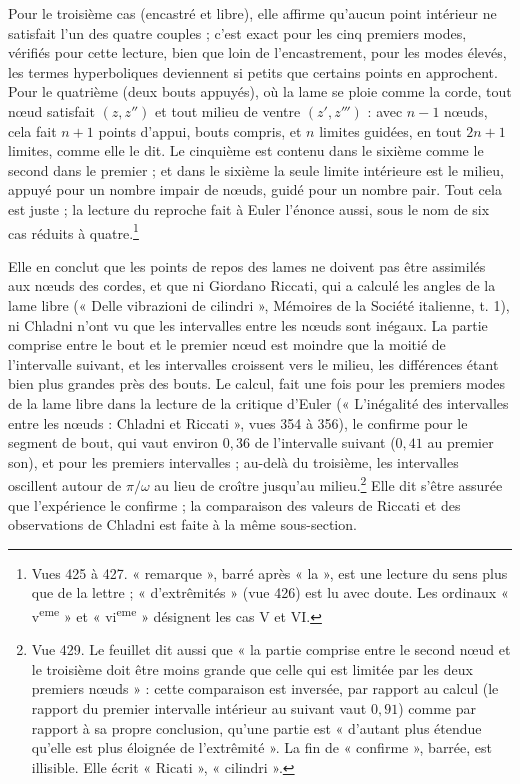 \documentclass[11pt,a4paper]{article}
\begin{document}
Pour le troisième cas (encastré et libre), elle affirme qu'aucun point intérieur ne
satisfait l'un des quatre couples ; c'est exact pour les cinq premiers modes, vérifiés
pour cette lecture, bien que loin de l'encastrement, pour les modes élevés, les termes
hyperboliques deviennent si petits que certains points en approchent. Pour le
quatrième (deux bouts appuyés), où la lame se ploie comme la corde, tout nœud satisfait
$(z, z'')$ et tout milieu de ventre $(z', z''')$ : avec $n-1$ nœuds, cela fait $n+1$
points d'appui, bouts compris, et $n$ limites guidées, en tout $2n+1$ limites, comme
elle le dit. Le cinquième est contenu dans le sixième comme le second dans le premier ;
et dans le sixième la seule limite intérieure est le milieu, appuyé pour un nombre
impair de nœuds, guidé pour un nombre pair. Tout cela est juste ; la lecture du
reproche fait à Euler l'énonce aussi, sous le nom de six cas réduits à
quatre.\footnote{Vues 425 à 427. « remarque », barré après « la », est une lecture du
sens plus que de la lettre ; « d'extrêmités » (vue 426) est lu avec doute. Les
ordinaux « v\textsuperscript{eme} » et « vi\textsuperscript{eme} » désignent les cas
V et VI.}

Elle en conclut que les points de repos des lames ne doivent pas être assimilés aux
nœuds des cordes, et que ni Giordano Riccati, qui a calculé les angles de la lame
libre (« Delle vibrazioni de cilindri », Mémoires de la Société italienne, t. 1), ni
Chladni n'ont vu que les intervalles entre les nœuds sont inégaux. La partie comprise
entre le bout et le premier nœud est moindre que la moitié de l'intervalle suivant, et
les intervalles croissent vers le milieu, les différences étant bien plus grandes
près des bouts. Le calcul, fait une fois pour les premiers modes de la lame libre dans
la lecture de la critique d'Euler (« L'inégalité des intervalles entre les
nœuds : Chladni et Riccati », vues 354 à 356), le confirme pour le segment de
bout, qui vaut environ $0{,}36$ de l'intervalle suivant ($0{,}41$ au premier son),
et pour les premiers intervalles ; au-delà du troisième, les intervalles oscillent
autour de $\pi/\omega$ au lieu de croître jusqu'au milieu.\footnote{Vue 429. Le feuillet dit aussi que « la partie
comprise entre le second nœud et le troisième doit être moins grande que celle qui est
limitée par les deux premiers nœuds » : cette comparaison est inversée, par rapport au
calcul (le rapport du premier intervalle intérieur au suivant vaut $0{,}91$) comme par
rapport à sa propre conclusion, qu'une partie est « d'autant plus étendue qu'elle est
plus éloignée de l'extrêmité ». La fin de « confirme », barrée, est illisible. Elle
écrit « Ricati », « cilindri ».} Elle dit s'être assurée que l'expérience le confirme ;
la comparaison des valeurs de Riccati et des observations de Chladni est faite à
la même sous-section.
\end{document}
